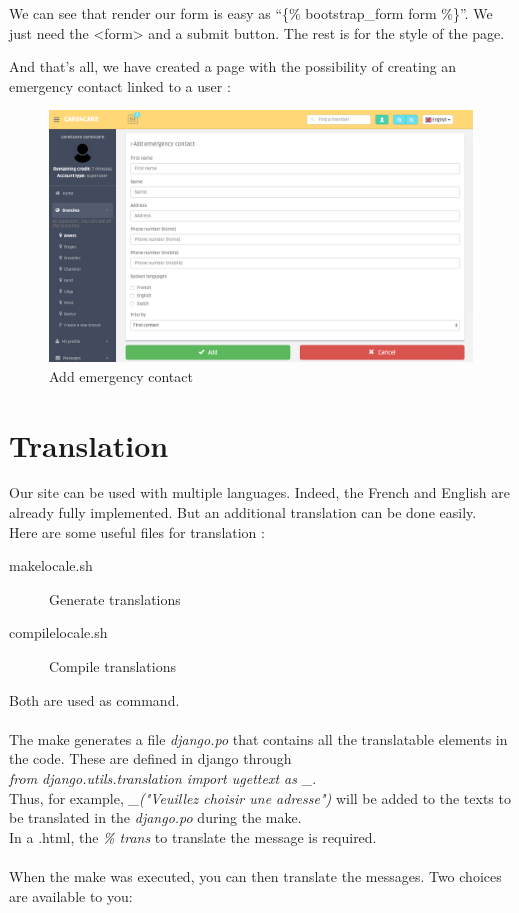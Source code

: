 \documentclass[11pt, a4paper]{article}   	%
\begin{document}
We can see that render our form is easy as ``\{\% bootstrap\_form form \%\}''. We just need the <form> and a submit button. The rest is for the style of the page.

And that's all, we have created a page with the possibility of creating an emergency contact linked to a user :

\begin{figure}[!ht]
   \includegraphics[width=\linewidth]{addec.png}
   \caption{Add emergency contact}
\end{figure}






\section{Translation}

Our site can be used with multiple languages. Indeed, the French and English are already fully implemented. But an additional translation can be done easily.\\
Here are some useful files for translation :

\begin{description}
\item [makelocale.sh] Generate translations
\item [compilelocale.sh] Compile translations
\end{description}
Both are used as command.\\
\\
The make generates a file \textit{django.po} that contains all the translatable elements in the code. These are defined in django through \\ \textit{from django.utils.translation import ugettext as \_}. \\
Thus, for example, \textit{\_("Veuillez choisir une adresse")} will be added to the texts to be translated in the \textit{django.po} during the make. \\
In a .html, the \textit{\% trans} to translate the message is required.\\
\\
When the make was executed, you can then translate the messages. Two choices are available to you:
\end{document}
